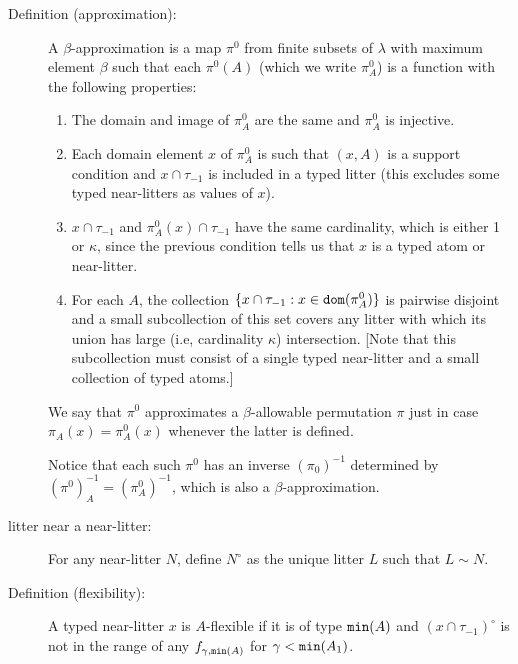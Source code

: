 \documentclass[112pt]{article}
\begin{document}
\begin{description}

\item[Definition (approximation):]   A $\beta$-approximation is a map $\pi^0$ from finite subsets of $\lambda$ with maximum element $\beta$ such
that each $\pi^0(A)$ (which we write $\pi^0_A$) is a function with the following properties:

\begin{enumerate}

\item  The domain and image of $\pi^0_A$ are the same and $\pi^0_A$ is injective.

\item Each domain element $x$ of $\pi^0_A$ is such that $(x,A)$ is a support condition and $x \cap \tau_{-1}$ is included in a typed litter (this excludes some typed near-litters as values of $x$).

\item $x \cap \tau_{-1}$ and $\pi^0_A(x) \cap \tau_{-1}$ have the same cardinality, which is either 1 or $\kappa$, since the previous condition tells us that $x$ is a typed atom or near-litter.

\item  For each $A$, the collection $\{x \cap \tau_{-1}: x \in {\tt dom}(\pi^0_A)\}$ is pairwise disjoint  and a small subcollection of this set covers any litter with which its union has large (i.e, cardinality $\kappa$)  intersection.  [Note that this subcollection must consist of a single typed near-litter and a small collection of typed atoms.]

\end{enumerate}

We say that $\pi^0$ approximates a $\beta$-allowable permutation $\pi$ just in case $\pi_A(x) = \pi^0_A(x)$ whenever the latter is defined.

Notice that each such $\pi^0$ has an inverse $(\pi_0)^{-1}$ determined by $(\pi^0)^{-1}_A = (\pi^0_A)^{-1}$, which is also a $\beta$-approximation.

\item[litter near a near-litter:]  For any near-litter $N$, define $N^\circ$ as the unique litter $L$ such that $L \sim N$.

\item[Definition (flexibility):]  A typed near-litter $x$ is $A$-flexible if it is of type ${\tt min}(A)$ and $(x \cap \tau_{-1})^\circ$ is not in the range of any $f_{\gamma,{\tt min}(A)}$
for $\gamma<{\tt min}(A_1)$.




\end{description}
\end{document}
